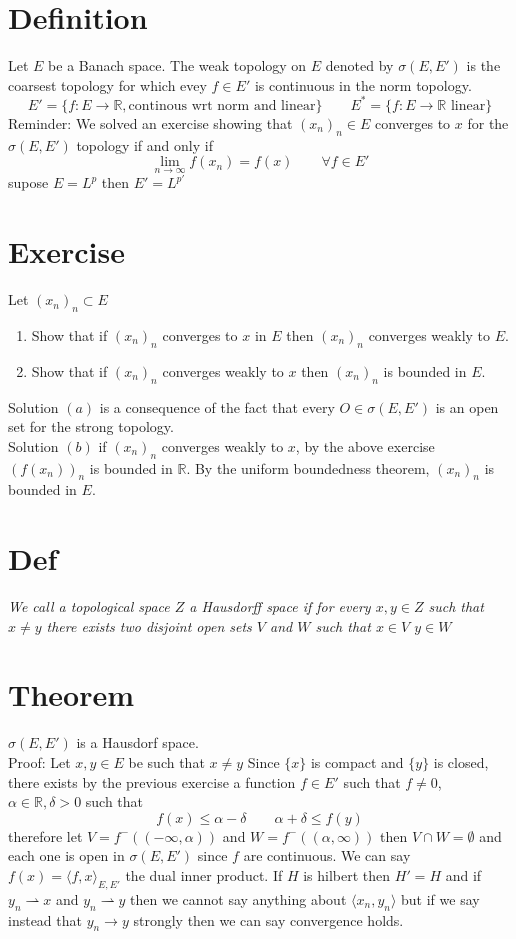 \documentclass[11pt]{article}
\begin{document}
\section{Definition}
Let $E$ be a Banach space.
The weak topology on $E$ denoted by  $\sigma(E, E')$ is the coarsest topology for which evey $f \in E'$ is continuous in the norm topology.
\[
    E' = \{f: E \rightarrow \mathbb{R}, \text{continous wrt norm and linear}\} \qquad E^{*} = \{f: E \rightarrow \mathbb{R} \text{ linear} \}
\] 
Reminder: We solved an exercise showing that $(x_n)_n \in E$ converges to  $x$ for the  $ \sigma(E,E')$ topology if and only if
\[
\lim_{n\to \infty} f(x_n) = f(x) \qquad \forall f \in E'
\] 
supose $E = L^{p}$ then $E' = L^{p'}$ \\

\section{Exercise}
Let $(x_n)_n \subset E$ \\
\begin{enumerate}
    \item
        Show that if $(x_n)_n$ converges to  $x$ in  $ E$  then $(x_n)_n$ converges weakly to  $E$.
    \item Show that if  $(x_n)_n$ converges weakly to  $x$ then $(x_n)_n$ is bounded in  $E$.
\end{enumerate}
Solution $(a)$ is a consequence of the fact that every  $O \in \sigma( E, E')$ is an open set for the strong topology.\\
Solution  $(b)$ if $(x_n)_n$ converges weakly to $x$, by the above exercise $(f(x_n))_n$ is bounded in  $ \mathbb{R}$. By the uniform boundedness theorem, $(x_n)_n$ is bounded in  $E$.

\section{Def}
\emph{
    We call a topological space $Z$ a Hausdorff space if for every $x,y \in Z$ such that  $x \ne y$ there exists two disjoint open sets  $V$ and $W$ such that  $x \in V$  $y \in W$
}

\section{Theorem}
$\sigma(E, E')$ is a Hausdorf space.\\ Proof: Let $x, y \in E$ be such that  $x \ne y$ Since  $\{x\}$ is compact
and  $\{y\}$ is closed, there exists by the previous exercise a function  $f \in E'$ such that  $f \ne 0$,  $\alpha \in \mathbb{R}, \delta > 0$ such that
\[
f(x) \le \alpha - \delta \qquad \alpha + \delta \le f(y)
\] 
therefore let $V = f^{-}((-\infty, \alpha))$ and $W = f^{-}((\alpha ,\infty))$ then $V \cap W = \emptyset$ and each one is open in $\sigma(E, E')$ since  $f$ are continuous.
We can say $f(x) = \langle f , x \rangle_{E,E'}$ the dual inner product. If $H$ is hilbert then $H' = H$ and if  $y_n \rightharpoonup x$ and  $y_n \rightharpoonup y$ then we cannot say anything about  $\langle x_n, y_n\rangle$ but if we say
instead that $y_n \rightarrow y$ strongly then we can say convergence holds.
\end{document}

